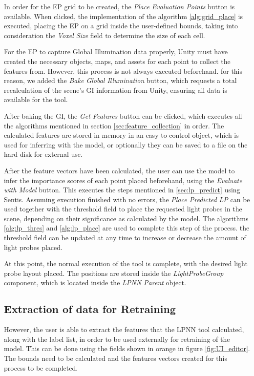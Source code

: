 In order for the EP grid to be created, the \textit{Place Evaluation Points} button is available. When clicked, the implementation of the algorithm \ref{alg:grid_place} is executed, placing the EP on a grid inside the user-defined bounds, taking into consideration the \textit{Voxel Size} field to determine the size of each cell.\newline

For the EP to capture Global Illumination data properly, Unity must have created the necessary objects, maps, and assets for each point to collect the features from. However, this process is not always executed beforehand. for this reason, we added the \textit{Bake Global Illumination} button, which requests a total recalculation of the scene's GI information from Unity, ensuring all data is available for the tool.

After baking the GI, the \textit{Get Features} button can be clicked, which executes all the algorithms mentioned in section \ref{sec:feature_collection} in order. The calculated features are stored in memory in an easy-to-control object, which is used for inferring with the model, or optionally they can be saved to a file on the hard disk for external use.

After the feature vectors have been calculated, the user can use the model to infer the importance scores of each point placed beforehand, using the \textit{Evaluate with Model} button. This executes the steps mentioned in \ref{sec:lp_predict} using Sentis. Assuming execution finished with no errors, the \textit{Place Predicted LP} can be used together with the threshold field to place the requested light probes in the scene, depending on their significance as calculated by the model. The algorithms \ref{alg:lp_thres} and \ref{alg:lp_place} are used to complete this step of the process. the threshold field can be updated at any time to increase or decrease the amount of light probes placed.

At this point, the normal execution of the tool is complete, with the desired light probe layout placed. The positions are stored inside the \textit{LightProbeGroup} component, which is located inside the \textit{LPNN Parent} object. 

\subsection{Extraction of data for Retraining}
However, the user is able to extract the features that the LPNN tool calculated, along with the label list, in order to be used externally for retraining of the model. This can be done using the fields shown in orange in figure \ref{fig:UI_editor}. The bounds need to be calculated and the features vectors created for this process to be completed. 

